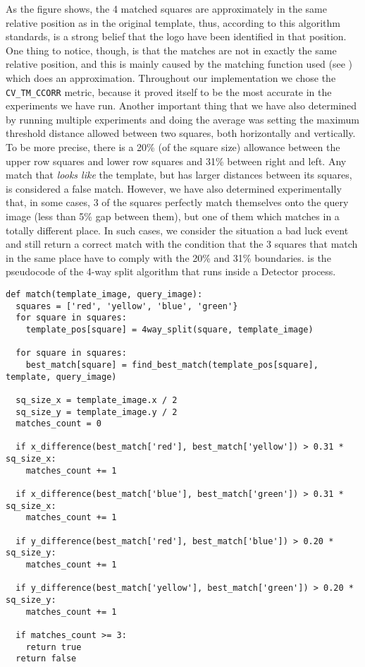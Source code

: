 As the figure shows, the 4 matched squares are approximately in the same
relative position as in the original template, thus, according to this
algorithm standards, is a strong belief that the logo have been identified in
that position. One thing to notice, though, is that the matches are not in
exactly the same relative position, and this is mainly caused by the matching
function used (see ) which
does an approximation. Throughout our implementation we chose the
\texttt{CV_TM_CCORR} metric, because it proved itself to be the most accurate
in the experiments we have run. Another important thing that we have also
determined by running multiple experiments and doing the average was setting
the maximum threshold distance allowed between two squares, both horizontally
and vertically. To be more precise, there is a 20\% (of the square size)
allowance between the upper row squares and lower row squares and 31\% between
right and left. Any match that \textit{looks like} the template, but has
larger distances between its squares, is considered a false match. However, we
have also determined experimentally that, in some cases, 3 of the squares
perfectly match themselves onto the query image (less than 5\% gap between
them), but one of them which matches in a totally different place. In such
cases, we consider the situation a bad luck event and still return a correct
match with the condition that the 3 squares that match in the same place have
to comply with the 20\% and 31\% boundaries.
 is the pseudocode of
the 4-way split algorithm that runs inside a Detector process.

\lstset{language=Python,caption=4 way splitting template matching algorithm,label=lst:4-way-alg}
\begin{lstlisting}
def match(template_image, query_image):
  squares = ['red', 'yellow', 'blue', 'green'}
  for square in squares:
    template_pos[square] = 4way_split(square, template_image)

  for square in squares:
    best_match[square] = find_best_match(template_pos[square], template, query_image)

  sq_size_x = template_image.x / 2
  sq_size_y = template_image.y / 2
  matches_count = 0

  if x_difference(best_match['red'], best_match['yellow']) > 0.31 * sq_size_x:
    matches_count += 1

  if x_difference(best_match['blue'], best_match['green']) > 0.31 * sq_size_x:
    matches_count += 1

  if y_difference(best_match['red'], best_match['blue']) > 0.20 * sq_size_y:
    matches_count += 1

  if y_difference(best_match['yellow'], best_match['green']) > 0.20 * sq_size_y:
    matches_count += 1

  if matches_count >= 3:
    return true
  return false
\end{lstlisting}

